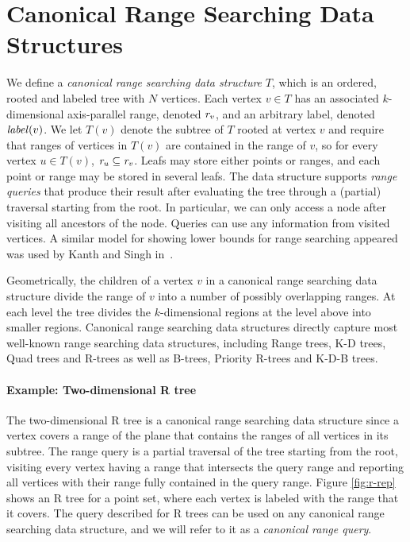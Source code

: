 \section{Canonical Range Searching Data Structures}\label{sec:canrsds}
We define a \emph{canonical range searching data structure} $T$, which is an ordered, rooted and labeled tree with $N$ vertices. Each vertex $v \in T$ has an associated $k$-dimensional axis-parallel range, denoted $\mathit{r_{v}}$, and an arbitrary label, denoted $\mathit{label}(v)$. We let $T(v)$ denote the subtree of $T$ rooted at vertex $v$ and require that ranges of vertices in $T(v)$ are contained in the range of $v$, so for every vertex $u \in T(v)$, $\mathit{r_{u}} \subseteq \mathit{r_{v}}$. Leafs may store either points or ranges, and each point or range may be stored in several leafs. The data structure supports \emph{range queries} that produce their result after evaluating the tree through a (partial) traversal starting from the root. In particular, we can only access a node after visiting all ancestors of the node. Queries can use any information from visited vertices. A similar model for showing lower bounds for range searching appeared was used by Kanth and Singh in~\cite{kanth1999optimal}.

Geometrically, the children of a vertex $v$ in a canonical range searching data structure divide the range of $v$ into a number of possibly overlapping ranges. At each level the tree divides the $k$-dimensional regions at the level above into smaller regions. Canonical range searching data structures directly capture most well-known range searching data structures, including Range trees, K-D trees, Quad trees and R-trees as well as B-trees, Priority R-trees and K-D-B trees.


\paragraph{Example: Two-dimensional R tree}
The two-dimensional R tree is a canonical range searching data structure since a vertex covers a range of the plane that contains the ranges of all vertices in its subtree. The range query is a partial traversal of the tree starting from the root, visiting every vertex having a range that intersects the query range and reporting all vertices with their range fully contained in the query range. Figure \ref{fig:r-rep} shows an R tree for a point set, where each vertex is labeled with the range that it covers. The query described for R trees can be used on any canonical range searching data structure, and we will refer to it as a \emph{canonical range query}.

